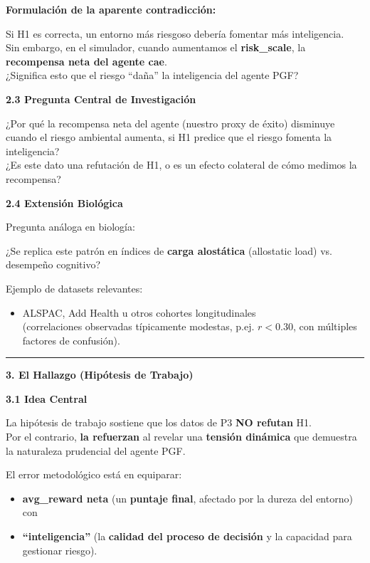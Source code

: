 \textbf{Formulación de la aparente contradicción:}

Si H1 es correcta, un entorno más riesgoso debería fomentar más
inteligencia.\\
Sin embargo, en el simulador, cuando aumentamos el \textbf{risk\_scale},
la \textbf{recompensa neta del agente cae}.\\
¿Significa esto que el riesgo ``daña'' la inteligencia del agente PGF?

\textbf{2.3 Pregunta Central de Investigación}

¿Por qué la recompensa neta del agente (nuestro proxy de éxito)
disminuye cuando el riesgo ambiental aumenta, si H1 predice que el
riesgo fomenta la inteligencia?\\
¿Es este dato una refutación de H1, o es un efecto colateral de cómo
medimos la recompensa?

\textbf{2.4 Extensión Biológica}

Pregunta análoga en biología:

¿Se replica este patrón en índices de \textbf{carga alostática}
(allostatic load) vs. desempeño cognitivo?

Ejemplo de datasets relevantes:

\begin{itemize}
\item
  ALSPAC, Add Health u otros cohortes longitudinales\\
  (correlaciones observadas típicamente modestas, p.ej. \(r < 0.30\),
  con múltiples factores de confusión).
\end{itemize}

\begin{center}\rule{0.5\linewidth}{0.5pt}\end{center}

\textbf{3. El Hallazgo (Hipótesis de Trabajo)}

\textbf{3.1 Idea Central}

La hipótesis de trabajo sostiene que los datos de P3 \textbf{NO refutan}
H1.\\
Por el contrario, \textbf{la refuerzan} al revelar una \textbf{tensión
dinámica} que demuestra la naturaleza prudencial del agente PGF.

El error metodológico está en equiparar:

\begin{itemize}
\item
  \textbf{avg\_reward neta} (un \textbf{puntaje final}, afectado por la
  dureza del entorno)\\
  con
\item
  \textbf{``inteligencia''} (la \textbf{calidad del proceso de decisión}
  y la capacidad para gestionar riesgo).
\end{itemize}

